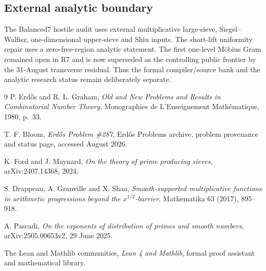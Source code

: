 \documentclass[11pt]{article}
\theoremstyle{definition}
\newcommand{\1}{\mathbf 1}
\begin{document}
\subsection*{External analytic boundary}
The Balanced7 hostile audit uses external multiplicative large-sieve, Siegel--Walfisz,
one-dimensional upper-sieve and Shiu inputs.  The short-lift uniformity repair uses a
zero-free-region analytic statement.  The first one-level M\"obius Gram remained open in R7 and is now superseded as the controlling public frontier by the 31-August transverse residual.
Thus the formal compiler/source bank and the analytic research status remain deliberately
separate.


\begin{thebibliography}{9}
P. Erd\H{o}s and R. L. Graham,
\emph{Old and New Problems and Results in Combinatorial Number Theory},
Monographies de L'Enseignement Math\'ematique, 1980, p.~33.

T. F. Bloom,
\emph{Erd\H{o}s Problem \#287}, Erd\H{o}s Problems archive,
problem provenance and status page, accessed August 2026.

K. Ford and J. Maynard,
\emph{On the theory of prime producing sieves},
arXiv:2407.14368, 2024.

S. Drappeau, A. Granville and X. Shao,
\emph{Smooth-supported multiplicative functions in arithmetic progressions beyond the
$x^{1/2}$-barrier}, Mathematika 63 (2017), 895--918.

A. Pascadi,
\emph{On the exponents of distribution of primes and smooth numbers},
arXiv:2505.00653v2, 29 June 2025.

The Lean and Mathlib communities,
\emph{Lean 4 and Mathlib}, formal proof assistant and mathematical library.
\end{thebibliography}
\end{document}
